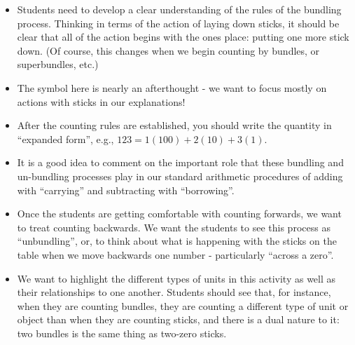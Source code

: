 \documentclass{ximera}
\begin{document}
\begin{problem}
\begin{instructorNotes}
\begin{itemize}
	\item Students need to develop a clear understanding of the rules of the bundling process. Thinking in terms of the action of laying down sticks, it should be clear that all of the action begins with the ones place:  putting one more stick down. (Of course, this changes when we begin counting by bundles, or superbundles, etc.)
	\item The symbol here is nearly an afterthought - we want to focus mostly on actions with sticks in our explanations!
	\item After the counting rules are established, you should write the quantity in ``expanded form'', e.g., $123 = 1(100) + 2(10) + 3(1)$.
	\item It is a good idea to comment on the important role that these bundling and un-bundling processes play in our standard arithmetic procedures of adding with ``carrying'' and subtracting with ``borrowing''. 
	\item Once the students are getting comfortable with counting forwards, we want to treat counting backwards.  We want the students to see this process as ``unbundling'', or, to think about what is happening with the sticks on the table when we move backwards one number - particularly ``across a zero''. 
	\item We want to highlight the different types of units in this activity as well as their relationships to one another.  Students should see that, for instance, when they are counting bundles, they are counting a different type of unit or object than when they are counting sticks, and there is a dual nature to it: two bundles is the same thing as two-zero sticks.
\end{itemize}

\end{instructorNotes}



\end{problem}
\end{document}
